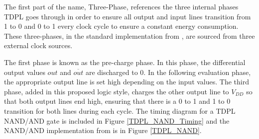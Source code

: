 \documentclass[conference, 12pt]{IEEEtran}
\begin{document}
			The first part of the name, Three-Phase, references the three internal phases TDPL goes through in order to ensure all output and input lines transition from 1 to 0 and 0 to 1 every clock cycle to ensure a constant energy consumption. These three-phases, in the standard implementation from \cite{b1}, are sourced from three external clock sources.

			The first phase is known as the pre-charge phase. In this phase, the differential output values $out$ and $\overline{out}$ are discharged to 0. In the following evaluation phase, the appropriate output line is set high depending on the input values. The third phase, added in this proposed logic style, charges the other output line to $V_{DD}$ so that both output lines end high, ensuring that there is a 0 to 1 and 1 to 0 transition for both lines during each cycle. The timing diagram for a TDPL NAND/AND gate is included in Figure \ref{TDPL_NAND_Timing} and the NAND/AND implementation from \cite{b1} is in Figure \ref{TDPL_NAND}.
\end{document}
